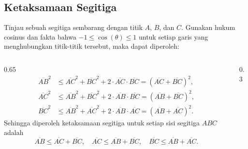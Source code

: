 \documentclass[aspectratio=169]{beamer}
\theoremstyle{definition}
\begin{document}
\subsection{Ketaksamaan Segitiga}
\begin{frame}{\insertsection}{\insertsubsection}
  Tinjau sebuah segitiga sembarang dengan titik $A$, $B$, dan $C$. Gunakan hukum cosinus dan fakta bahwa $-1\leq\cos(\theta) \leq 1$ untuk setiap garis yang menghubungkan titik-titik tersebut, maka dapat diperoleh:
  \begin{columns}[T]
    \begin{column}{0.65\textwidth}
      \begin{align*}
        \overline{AB}^2 & \leq \overline{AC}^2 + \overline{BC}^2 + 2 \cdot \overline{AC} \cdot \overline{BC} = (\overline{AC} + \overline{BC})^2, \\
        \overline{AC}^2 & \leq \overline{AB}^2 + \overline{BC}^2 + 2 \cdot \overline{AB} \cdot \overline{BC} = (\overline{AB} + \overline{BC})^2, \\
        \overline{BC}^2 & \leq \overline{AB}^2 + \overline{AC}^2 + 2 \cdot \overline{AB} \cdot \overline{AC} = (\overline{AB} + \overline{AC})^2.
      \end{align*}
      Sehingga diperoleh ketaksamaan segitiga untuk setiap sisi segitiga $ABC$ adalah
      \[
        \overline{AB} \leq \overline{AC} + \overline{BC}, \quad \overline{AC} \leq \overline{AB} + \overline{BC}, \quad \overline{BC} \leq \overline{AB} + \overline{AC}.
      \]
    \end{column}
    \begin{column}{0.3\textwidth}
      \noindent
    \end{column}
  \end{columns}

\end{frame}
\end{document}
